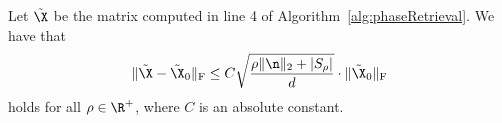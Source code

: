 
\begin{lem}
Let $\tilde{\X}$ be the matrix computed in line  4 of Algorithm~\ref{alg:phaseRetrieval}.  We have that $$\| \tilde{\X} - \tilde{\X}_0 \|_{\rm F} \leq C \sqrt{\frac{\rho \| \n \|_2 + \left| S_\rho \right|}{d}} \cdot \| \tilde{\X}_0 \|_{\rm F}$$
holds for all $\rho \in \R^+$, where $C$ is an absolute constant.
\label{lem:EtaBound}
\end{lem}

